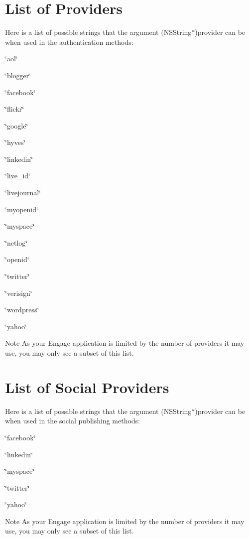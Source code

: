 \hypertarget{_providers_basicProviders}{}\section{List of Providers}\label{_providers_basicProviders}
Here is a list of possible strings that the argument (NSString$\ast$)provider can be when used in the authentication methods:
\begin{DoxyItemize}
\item \char`\"{}aol\char`\"{}
\item \char`\"{}blogger\char`\"{}
\item \char`\"{}facebook\char`\"{}
\item \char`\"{}flickr\char`\"{}
\item \char`\"{}google\char`\"{}
\item \char`\"{}hyves\char`\"{}
\item \char`\"{}linkedin\char`\"{}
\item \char`\"{}live\_\-id\char`\"{}
\item \char`\"{}livejournal\char`\"{}
\item \char`\"{}myopenid\char`\"{}
\item \char`\"{}myspace\char`\"{}
\item \char`\"{}netlog\char`\"{}
\item \char`\"{}openid\char`\"{}
\item \char`\"{}twitter\char`\"{}
\item \char`\"{}verisign\char`\"{}
\item \char`\"{}wordpress\char`\"{}
\item \char`\"{}yahoo\char`\"{}
\end{DoxyItemize}

\begin{DoxyNote}{Note}
As your Engage application is limited by the number of providers it may use, you may only see a subset of this list.
\end{DoxyNote}
\hypertarget{_providers_socialProviders}{}\section{List of Social Providers}\label{_providers_socialProviders}
Here is a list of possible strings that the argument (NSString$\ast$)provider can be when used in the social publishing methods:
\begin{DoxyItemize}
\item \char`\"{}facebook\char`\"{}
\item \char`\"{}linkedin\char`\"{}
\item \char`\"{}myspace\char`\"{}
\item \char`\"{}twitter\char`\"{}
\item \char`\"{}yahoo\char`\"{}
\end{DoxyItemize}

\begin{DoxyNote}{Note}
As your Engage application is limited by the number of providers it may use, you may only see a subset of this list. 
\end{DoxyNote}
